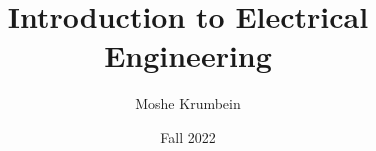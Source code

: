 
\usepackage{subfiles}

\title{Introduction to Electrical Engineering}
\def \thecoursenum {83335}
\def \theinstructor {Ori Katz}
\author{Moshe Krumbein}
\date{Fall 2022}





\setcounter{tocdepth}{2}
\tableofcontents
\cleardoublepage




